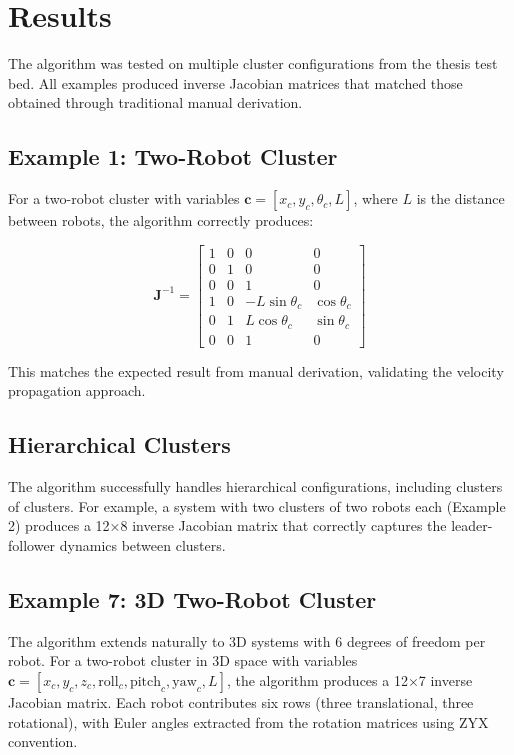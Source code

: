 \documentclass[lettersize,journal]{IEEEtran}
\begin{document}
\section{Results}

The algorithm was tested on multiple cluster configurations from the thesis test bed. All examples produced inverse Jacobian matrices that matched those obtained through traditional manual derivation.

\subsection{Example 1: Two-Robot Cluster}

For a two-robot cluster with variables $\mathbf{c} = [x_c, y_c, \theta_c, L]$, where $L$ is the distance between robots, the algorithm correctly produces:

$$\mathbf{J}^{-1} = \begin{bmatrix}
1 & 0 & 0 & 0 \\
0 & 1 & 0 & 0 \\
0 & 0 & 1 & 0 \\
1 & 0 & -L\sin\theta_c & \cos\theta_c \\
0 & 1 & L\cos\theta_c & \sin\theta_c \\
0 & 0 & 1 & 0
\end{bmatrix}$$

This matches the expected result from manual derivation, validating the velocity propagation approach.

\subsection{Hierarchical Clusters}

The algorithm successfully handles hierarchical configurations, including clusters of clusters. For example, a system with two clusters of two robots each (Example 2) produces a 12×8 inverse Jacobian matrix that correctly captures the leader-follower dynamics between clusters.

\subsection{Example 7: 3D Two-Robot Cluster}

The algorithm extends naturally to 3D systems with 6 degrees of freedom per robot. For a two-robot cluster in 3D space with variables $\mathbf{c} = [x_c, y_c, z_c, \text{roll}_c, \text{pitch}_c, \text{yaw}_c, L]$, the algorithm produces a 12×7 inverse Jacobian matrix. Each robot contributes six rows (three translational, three rotational), with Euler angles extracted from the rotation matrices using ZYX convention.
\end{document}
